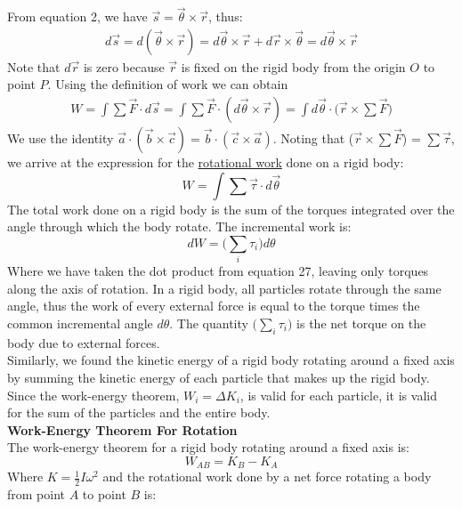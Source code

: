 \documentclass[a4paper]{article}
\let\bf\textbf
\begin{document}
From equation 2, we have $\vec{s} = \vec{\theta}\times\vec{r}$, thus:
\begin{align*}
    d\vec{s} = d(\vec{\theta}\times\vec{r}) = d\vec{\theta}\times\vec{r} + d\vec{r}\times\vec{\theta} = d\vec{\theta}\times\vec{r}
\end{align*}
Note that $d\vec{r}$ is zero because $\vec{r}$ is fixed on the rigid body from the origin $O$ to point $P$. Using the definition of work we can obtain
\begin{align*}
    W = \int\sum\vec{F}\cdot d\vec{s} = \int\sum\vec{F}\cdot(d\vec{\theta}\times\vec{r}) = \int d\vec{\theta}\cdot\Big(\vec{r}\times\sum\vec{F}\Big)
\end{align*}
We use the identity $\vec{a}\cdot(\vec{b}\times\vec{c}) = \vec{b}\cdot(\vec{c}\times\vec{a})$. Noting that ($\vec{r}\times\sum\vec{F}$) = $\sum\vec{\tau}$, we arrive at the expression for the \underline{rotational work} done on a rigid body:
\begin{equation}
    W = \int\sum\vec{\tau}\cdot d\vec{\theta}
\end{equation}
The total work done on a rigid body is the sum of the torques integrated over the angle through which the body rotate. The incremental work is:
\begin{equation}
    dW = \bigg(\sum_{i}\tau_i\bigg)d\theta
\end{equation}
Where we have taken the dot product from equation 27, leaving only torques along the axis of rotation. In a rigid body, all particles rotate through the same angle, thus the work of every external force is equal to the torque times the common incremental angle $d\theta$. The quantity $\Big(\sum\limits_i\tau_i\Big)$ is the net torque on the body due to external forces.\\
Similarly, we found the kinetic energy of a rigid body rotating around a fixed axis by summing the kinetic energy of each particle that makes up the rigid body. Since the work-energy theorem, $W_i = \Delta K_i$, is valid for each particle, it is valid for the sum of the particles and the entire body.
\vspace{2mm}\\
\bf{Work-Energy Theorem For Rotation}
\vspace{1mm}\\
The work-energy theorem for a rigid body rotating around a fixed axis is:
\begin{equation}
    W_{AB} = K_B - K_A
\end{equation}
Where $K = \frac{1}{2}I\omega^2$ and the rotational work done by a net force rotating a body from point $A$ to point $B$ is:
\end{document}
